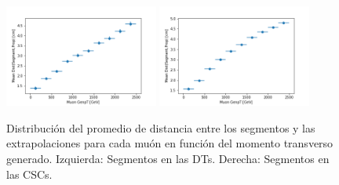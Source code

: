 \begin{figure}[h!]
\centering
\includegraphics[width=0.45\textwidth]{figures/data_genpt_DT_MeanDist.png}
\includegraphics[width=0.45\textwidth]{figures/data_genpt_CSC_MeanDist.png}
\caption{Distribuci\'on del promedio de distancia entre los segmentos y las extrapolaciones para cada mu\'on en funci\'on del momento transverso generado. Izquierda: Segmentos en las DTs. Derecha: Segmentos en las CSCs.}
\label{fig:data_nSegmentsMean}        
\end{figure}


\clearpage


 
